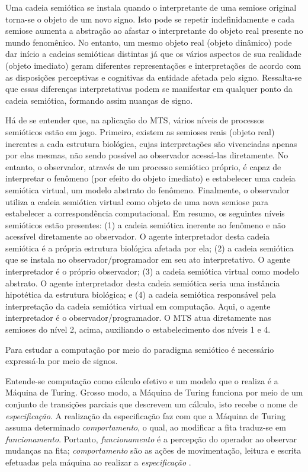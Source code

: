 Uma cadeia semiótica se instala quando o interpretante de uma semiose original torna-se o objeto de um novo signo. Isto pode se repetir indefinidamente e cada semiose aumenta a abstração ao afastar o interpretante do objeto real presente no mundo fenomênico. No entanto, um mesmo objeto real (objeto dinâmico) pode dar início a cadeias semióticas distintas já que os vários aspectos de sua realidade (objeto imediato) geram diferentes representações e interpretações de acordo com as disposições perceptivas e cognitivas da entidade afetada pelo signo. Ressalta-se que essas diferenças interpretativas podem se manifestar em qualquer ponto da cadeia semiótica, formando assim nuanças de signo.

Há de se entender que, na aplicação do MTS, vários níveis de processos semióticos estão em jogo. Primeiro, existem as semioses reais (objeto real) inerentes a cada estrutura biológica, cujas interpretações são vivenciadas apenas por elas mesmas, não sendo possível ao observador acessá-las diretamente. No entanto, o observador, através de um processo semiótico próprio, é capaz de interpretar o fenômeno (por efeito do objeto imediato) e estabelecer uma cadeia semiótica virtual, um modelo abstrato do fenômeno. Finalmente, o observador utiliza a cadeia semiótica virtual como objeto de uma nova semiose para estabelecer a correspondência computacional. Em resumo, os seguintes níveis semióticos estão presentes: (1) a cadeia semiótica inerente ao fenômeno e não acessível diretamente ao observador. O agente interpretador desta cadeia semiótica é a própria estrutura biológica afetada por ela; (2) a cadeia semiótica que se instala no observador/programador em seu ato interpretativo. O agente interpretador é o próprio observador; (3) a cadeia semiótica virtual como modelo abstrato. O agente interpretador desta cadeia semiótica seria uma instância hipotética da estrutura biológica; e (4) a cadeia semiótica responsável pela interpretação da cadeia semiótica virtual em computação. Aqui, o agente interpretador é o observador/programador. O MTS atua diretamente nas semioses do nível 2, acima, auxiliando o estabelecimento dos níveis 1 e 4.

Para estudar a computação por meio do paradigma semiótico é necessário expressá-la por meio de signos.


Entende-se computação como cálculo efetivo e um modelo que o realiza é a Máquina de Turing. Grosso modo, a Máquina de Turing funciona por meio de um conjunto de transições parciais que descrevem um cálculo, isto recebe o nome de \emph{especificação}. A realização da especificação faz com que a Máquina de Turing assuma determinado \emph{comportamento}, o qual, ao modificar a fita traduz-se em \emph{funcionamento}. Portanto, \emph{funcionamento} é a percepção do operador ao observar mudanças na fita; \emph{comportamento} são as ações de movimentação, leitura e escrita efetuadas pela máquina ao realizar a \emph{especificação} \cite{turing36}.

